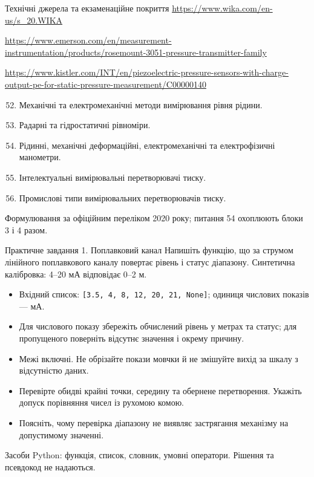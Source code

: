 \documentclass[aspectratio=169,11pt]{beamer}
\begin{document}
\begin{frame}{Технічні джерела та екзаменаційне покриття}
\tiny
\url{https://www.wika.com/en-us/s_20.WIKA}\par
\url{https://www.emerson.com/en/measurement-instrumentation/products/rosemount-3051-pressure-transmitter-family}\par
\url{https://www.kistler.com/INT/en/piezoelectric-pressure-sensors-with-charge-output-pe-for-static-pressure-measurement/C00000140}
\small
\begin{enumerate}\setcounter{enumi}{51}
\item Механічні та електромеханічні методи вимірювання рівня рідини.
\item Радарні та гідростатичні рівноміри.
\item Рідинні, механічні деформаційні, електромеханічні та електрофізичні манометри.
\item Інтелектуальні вимірювальні перетворювачі тиску.
\item Промислові типи вимірювальних перетворювачів тиску.
\end{enumerate}
Формулювання за офіційним переліком 2020 року; питання 54 охоплюють блоки 3 і 4 разом.
\end{frame}
\appendix
\begin{frame}{Практичне завдання 1. Поплавковий канал}
\small
Напишіть функцію, що за струмом лінійного поплавкового каналу повертає рівень і статус діапазону. Синтетична калібровка: 4--20 мА відповідає 0--2 м.
\begin{itemize}
\item Вхідний список: \texttt{[3.5, 4, 8, 12, 20, 21, None]}; одиниця числових показів --- мА.
\item Для числового показу збережіть обчислений рівень у метрах та статус; для пропущеного поверніть відсутнє значення і окрему причину.
\item Межі включні. Не обрізайте покази мовчки й не змішуйте вихід за шкалу з відсутністю даних.
\item Перевірте обидві крайні точки, середину та обернене перетворення. Укажіть допуск порівняння чисел із рухомою комою.
\item Поясніть, чому перевірка діапазону не виявляє застрягання механізму на допустимому значенні.
\end{itemize}
Засоби Python: функція, список, словник, умовні оператори. Рішення та псевдокод не надаються.
\end{frame}
\end{document}
